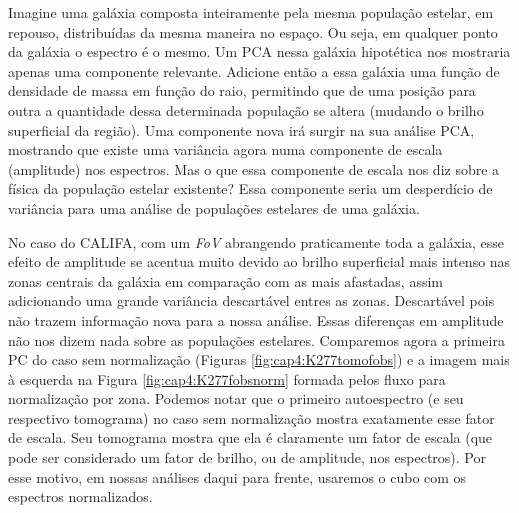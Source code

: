 Imagine uma galáxia composta inteiramente pela mesma população estelar, em repouso, distribuídas da mesma maneira no
espaço. Ou seja, em qualquer ponto da galáxia o espectro é o mesmo. Um PCA nessa galáxia hipotética nos mostraria apenas
uma componente relevante. Adicione então a essa galáxia uma função de densidade de massa em função do raio, permitindo
que de uma posição para outra a quantidade dessa determinada população se altera (mudando o brilho superficial da
região). Uma componente nova irá surgir na sua análise PCA, mostrando que existe uma variância agora numa componente de
escala (amplitude) nos espectros. Mas o que essa componente de escala nos diz sobre a física da população estelar
existente? Essa componente seria um desperdício de variância para uma análise de populações estelares de uma galáxia.

No caso do CALIFA, com um {\em FoV} abrangendo praticamente toda a galáxia, esse efeito de amplitude se acentua muito
devido ao brilho superficial mais intenso nas zonas centrais da galáxia em comparação com as mais afastadas, assim
adicionando uma grande variância descartável entres as zonas. Descartável pois não trazem informação nova para a nossa
análise. Essas diferenças em amplitude não nos dizem nada sobre as populações estelares. Comparemos agora a primeira PC
do caso sem normalização (Figuras \ref{fig:cap4:K277tomofobs}) e a imagem mais à esquerda na Figura
\ref{fig:cap4:K277fobsnorm} formada pelos fluxo para normalização por zona. Podemos notar que o primeiro autoespectro
(e seu respectivo tomograma) no caso sem normalização mostra exatamente esse fator de escala. Seu tomograma mostra que
ela é claramente um fator de escala (que pode ser considerado um fator de brilho, ou de amplitude, nos espectros). Por
esse motivo, em nossas análises daqui para frente, usaremos o cubo com os espectros normalizados.

